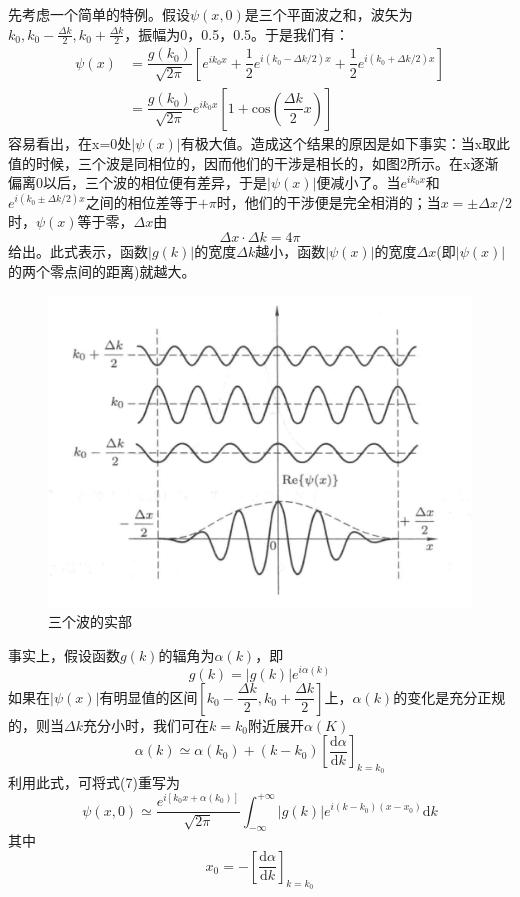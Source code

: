 \documentclass[]{article}
\begin{document}
先考虑一个简单的特例。假设$\psi(x,0)$是三个平面波之和，波矢为$k_0,k_0-\frac{\Delta k}{2},k_0+\frac{\Delta k}{2}$，振幅为0，0.5，0.5。于是我们有：
\begin{align}
	\psi(x)
	&=\dfrac{g(k_0)}{\sqrt{2\pi}}\left[ e^{ik_0x}+\dfrac{1}{2}e^{i(k_0-\Delta k/2)x}+\dfrac{1}{2}e^{i(k_0+\Delta k/2)x}\right] \nonumber\\
	&=\dfrac{g(k_0)}{\sqrt{2\pi}}e^{ik_0x}\left[ 1+\mathrm{cos}\left( \dfrac{\Delta k}{2}x\right) \right] 
\end{align}
容易看出，在x=0处$|\psi(x)|$有极大值。造成这个结果的原因是如下事实：当x取此值的时候，三个波是同相位的，因而他们的干涉是相长的，如图2所示。在x逐渐偏离0以后，三个波的相位便有差异，于是$|\psi(x)|$便减小了。当$e^{ik_0x}$和$e^{i(k_0\pm\Delta k/2)x}$之间的相位差等于$+\pi$时，他们的干涉便是完全相消的；当$x=\pm\Delta x/2$时，$\psi(x)$等于零，$\Delta x$由
\begin{equation}
	\Delta x\cdot\Delta k=4\pi
\end{equation}
给出。此式表示，函数$|g(k)|$的宽度$\Delta k$越小，函数$|\psi(x)|$的宽度$\Delta x$(即$|\psi(x)|$的两个零点间的距离)就越大。
\begin{figure}[H]
	\centering
	\includegraphics[scale=0.3]{2.png}
	\caption{三个波的实部}
	\label{Figure 2}
\end{figure}

事实上，假设函数$g(k)$的辐角为$\alpha(k)$，即
\begin{equation}
	g(k)=|g(k)|e^{i\alpha(k)}
\end{equation}
如果在$|\psi(x)|$有明显值的区间$\left[ k_0-\dfrac{\Delta k}{2},k_0+\dfrac{\Delta k}{2}\right] $上，$\alpha(k)$的变化是充分正规的，则当$\Delta k$充分小时，我们可在$k=k_0$附近展开$\alpha(K)$
\begin{equation}
	\alpha(k)\simeq\alpha(k_0)+(k-k_0)\left[ \dfrac{\mathrm{d}\alpha}{\mathrm{d}k}\right] _{k=k_0}
\end{equation}
利用此式，可将式(7)重写为
\begin{equation}
	\psi(x,0)\simeq\dfrac{e^{i[k_0x+\alpha(k_0)]}}{\sqrt{2\pi}}\int^{+\infty}_{-\infty} |g(k)|e^{i(k-k_0)(x-x_0)}\mathrm{d}k
\end{equation}
其中
\begin{equation}
	x_0=-\left[ \dfrac{\mathrm{d}\alpha}{\mathrm{d}k}\right] _{k=k_0}
\end{equation}
\end{document}
